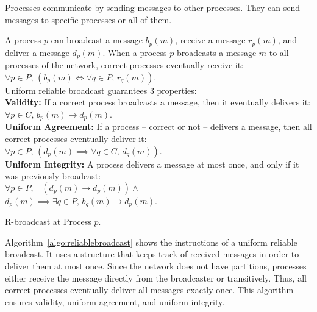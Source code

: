 Processes communicate by sending messages to other processes. They can send
messages to specific processes or all of them.

\begin{definition}
  A process $p$ can broadcast a message $b_p(m)$, receive a message $r_p(m)$,
  and deliver a message $d_p(m)$.  When a process $p$ broadcasts a message $m$
  to all processes of the network, correct processes eventually receive it: 
  $\forall p \in P,\, (b_p(m) \Leftrightarrow \forall q \in P,\, r_q(m))$. \\
  Uniform reliable broadcast guarantees 3 properties: \\
  \textbf{Validity:} If a correct process broadcasts a message, then it
  eventually
  delivers it: $\forall p \in C,\, b_p(m) \rightarrow d_p(m)$. \\
  \textbf{Uniform Agreement:} If a process -- correct or not -- delivers a
  message,
  then all correct processes eventually deliver it:\\
  $\forall p \in P,\, (d_p(m) \implies \forall q \in C,\, d_q(m))$. \\
  \textbf{Uniform Integrity:} A process delivers a message at most once, and
  only if it was previously broadcast:\\
  $\forall p \in P,\, \neg(d_p(m) \rightarrow d_p(m)) \wedge$\\$d_p(m) \implies
  \exists q \in P,\, b_q(m) \rightarrow d_p(m)$.
\end{definition}

\begin{algorithm}[h]
  
  \caption{\label{algo:reliablebroadcast}R-broadcast at Process $p$.}
\end{algorithm}

Algorithm~\ref{algo:reliablebroadcast} shows the instructions of a uniform
reliable broadcast. It uses a structure that keeps track of received messages in
order to deliver them at most once. 
Since the network does not have partitions, processes either receive the message
directly from the broadcaster or transitively. Thus, all correct processes
eventually deliver all messages exactly once. This algorithm ensures validity,
uniform agreement, and uniform integrity.

